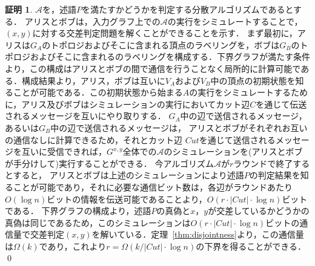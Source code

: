 \documentclass[12pt]{thesis}
\theoremstyle{definition}
\newtheorem*{prf*}{証明}
\begin{document}
\begin{prf*}
$\mathcal{A}$を，述語$P$を満たすかどうかを判定する分散アルゴリズムであるとする．
アリスとボブは，入力グラフ上での$\mathcal{A}$の実行をシミュレートすることで，
$(x, y)$に対する交差判定問題を解くことができることを示す．
まず最初に，アリスは$G_{A}$のトポロジおよびそこに含まれる頂点のラベリングを，ボブは$G_{B}$のトポロジおよびそこに含まれるのラベリングを構成する．下界グラフが満たす条件より，この構成はアリスとボブの間で通信を行うことなく局所的に計算可能である．構成結果より，アリス，ボブは互いに$V_A$および$V_B$中の頂点の初期状態を知ることが可能である．この初期状態から始まる$A$の実行をシミュレートするために，アリス及びボブはシミュレーションの実行においてカット辺$C$を通じて伝送されるメッセージを互いにやり取りする．
$G_{A}$中の辺で送信されるメッセージ，あるいは$G_{B}$中の辺で送信されるメッセージは，
アリスとボブがそれぞれお互いの通信なしに計算できるため，それとカット辺
$\mathit{Cut}$を通じて送信されるメッセージを互いに受信できれば，$G^{x,y}$全体での$\mathcal{A}$のシミュレーションを(アリスとボブが手分けして)実行することができる．
今アルゴリズム$\mathcal{A}$が$r$ラウンドで終了するとすると，
アリスとボブは上述のシミュレーションにより述語$P$の判定結果を知ることが可能であり，それに必要な通信ビット数は，各辺がラウンドあたり$O(\log n)$ビットの情報を伝送可能であることより，$O(r \cdot |\mathit{Cut}| \cdot \log n)$ビットである．
下界グラフの構成より，述語$P$の真偽と$x$，$y$が交差しているかどうかの真偽は同じであるため，このシミュレーションは$O(r \cdot |\mathit{Cut}| \cdot \log n)$ビットの通信量で交差判定$(x,y)$を解いている．定理~\ref{thm:disjointness}より，この通信量は$\Omega(k)$であり，これより$r = \Omega (k / |\mathit{Cut}| \cdot \log n)$の下界を得ることができる．
\qed
\end{prf*}
\end{document}
